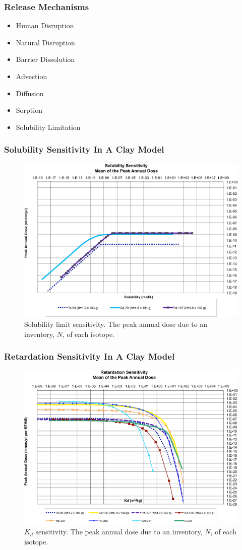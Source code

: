 
\begin{frame}[ctb!]
  \frametitle{Release Mechanisms}
  \begin{itemize} 
  \item Human Disruption
  \item Natural Disruption
  \item Barrier Dissolution
  \item Advection
  \item Diffusion
  \item Sorption
  \item Solubility Limitation
  \end{itemize}
\end{frame}

\begin{frame}
\frametitle{Solubility Sensitivity In A Clay Model}
\begin{figure}[ht]
  \centering
  \includegraphics[width=0.7\linewidth]{Solubility_Summary.eps}
  \caption{Solubility limit sensitivity. The peak annual dose due to an 
  inventory, $N$, of each isotope.}
  \label{fig:SolSum}
\end{figure}
\end{frame}

\begin{frame}[ctb]
\frametitle{Retardation Sensitivity In A Clay Model}
\begin{figure}[ht]
  \centering
  \includegraphics[width=0.7\linewidth]{Partitioning_Summary.eps}
  \caption{$K_d$ sensitivity.  The peak annual dose due to an inventory, 
  $N$, of each isotope.}
  \label{fig:KdSum}
\end{figure}
\end{frame}

